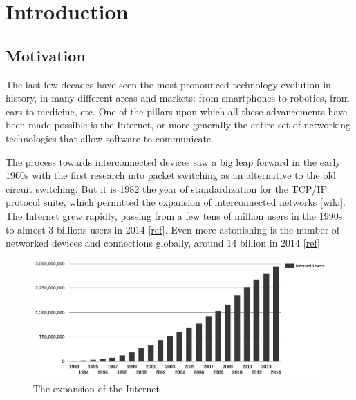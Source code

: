 \chapter{Introduction}
\label{chap:introduction}

\section{Motivation}
The last few decades have seen the most pronounced technology evolution in history, in many different areas and markets: from smartphones to robotics, from cars to medicine, etc. One of the pillars upon which all these advancements have been made possible is the Internet, or more generally the entire set of networking technologies that allow software to communicate. 


The process towards interconnected devices saw a big leap forward in the early 1960s with the first research into packet switching as an alternative to the old circuit switching. But it is 1982 the year of standardization for the TCP/IP protocol suite, which permitted the expansion of interconnected networks  [wiki]. The Internet grew rapidly, passing from a few tens of million users in the 1990s to almost 3 billions users in 2014 [\href{http://www.internetlivestats.com/internet-users}{ref}]. Even more astonishing is the number of networked devices and connections globally, around 14 billion in 2014 [\href{http://www.cisco.com/c/en/us/solutions/service-provider/visual-networking-index-vni/index.html#~complete-forecast}{ref}]

\begin{figure}[!htb]
\centering
\includegraphics[width=\textwidth]{images/internet_growth}
\caption{The expansion of the Internet}
\label{fig:internet_growth}
\end{figure}

